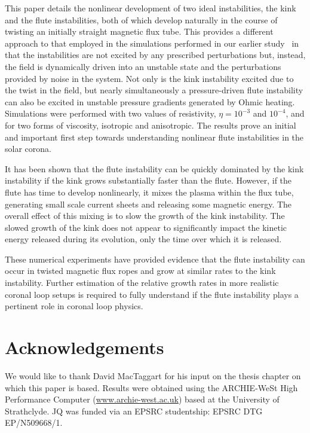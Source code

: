\documentclass[fleqn,usenatbib]{mnras}
\begin{document}
This paper details the nonlinear development of two ideal instabilities, the
kink and the flute instabilities, both of which develop naturally in the course
of twisting an initially straight magnetic flux tube. This provides a different
approach to that employed in the simulations performed in our earlier
study~\citep{quinnEffectAnisotropicViscosity2020} in that the instabilities are
not excited by any prescribed perturbations but, instead, the field is
dynamically driven into an unstable state and the perturbations provided by
noise in the system. Not only is the kink instability excited due to the twist
in the field, but nearly simultaneously a pressure-driven flute instability can
also be excited in unstable pressure gradients generated by Ohmic heating.
Simulations were performed with two values of resistivity, $\eta=10^{-3}$ and
$10^{-4}$, and for two forms of viscosity, isotropic and anisotropic. The
results prove an initial and important first step towards understanding
nonlinear flute instabilities in the solar corona.  

It has been shown that the flute instability can be quickly dominated by the
kink instability if the kink grows substantially faster than the flute.
However, if the flute has time to develop nonlinearly, it mixes the plasma
within the flux tube, generating small scale current sheets and releasing some
magnetic energy. The overall effect of this mixing is to slow the growth of the
kink instability. The slowed growth of the kink does not appear to
significantly impact the kinetic energy released during its evolution, only the
time over which it is released. 

These numerical experiments have provided evidence that the flute instability
can occur in twisted magnetic flux ropes and grow at similar rates to the kink
instability. Further estimation of the relative growth rates in more realistic
coronal loop setups is required to fully understand if the flute instability
plays a pertinent role in coronal loop physics.

\section*{Acknowledgements}

We would like to thank David MacTaggart for his input on the thesis chapter on
which this paper is based. Results were obtained using the ARCHIE-WeSt High
Performance Computer (\url{www.archie-west.ac.uk}) based at the University of
Strathclyde. JQ was funded via an EPSRC studentship: EPSRC DTG EP/N509668/1.
\end{document}
